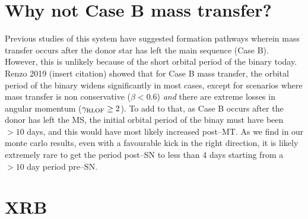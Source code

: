 \documentclass[linenumbers,trackchanges,twocolumn]{aastex701}
\begin{document}
\section{Why not Case B mass transfer?}

Previous studies of this system have suggested formation pathways wherein mass transfer occurs after the donor star has left the main sequence (Case B). However, this is unlikely because of the short orbital period of the binary today. Renzo 2019 (insert citation) showed that for Case B mass transfer, the orbital period of the binary widens significantly in most cases, except for scenarios where mass transfer is non conservative ($\beta < 0.6$) \textit{and} there are extreme losses in angular momentum ($\gamma_{\rm RLOF} \geq 2$). To add to that, as Case B occurs after the donor has left the MS, the initial orbital period of the binay must have been $>10$ days, and this would have most likely increased post--MT. As we find in our monte carlo results, even with a favourable kick in the right direction, it is likely extremely rare to get the period post--SN to less than 4 days starting from a $>10$ day period pre--SN.

\section{XRB}
\end{document}

